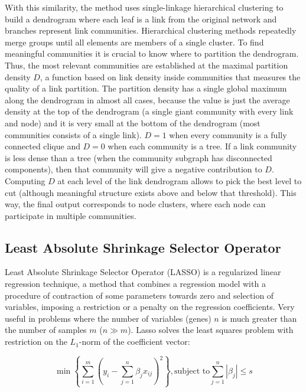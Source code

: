 \documentclass[12pt,journal, onecolumn]{IEEEtran}
\newcommand{\abs}[1]{\left\vert#1\right\vert}
\begin{document}
With this similarity, the method uses single-linkage hierarchical clustering to build a dendrogram where each leaf is a link from the original network and branches represent link communities. Hierarchical clustering methods repeatedly merge groups until all elements are members of a single cluster. To find meaningful communities it is crucial to know where to partition the dendrogram. Thus, the most relevant communities are established at the maximal partition density $D$, a function  based on link density inside communities that measures the quality of a link partition. The partition density has a single global maximum along the dendrogram in almost all cases, because the value is just the average density at the top of the dendrogram (a single giant community with every link and node) and it is very small at the bottom of the dendrogram (most communities consists of a single link). $D = 1$ when every community is a fully connected clique and $D = 0$ when each community is a tree. If a link community is less dense than a tree (when the community subgraph has disconnected components), then that community will give a negative contribution to $D$. Computing $D$ at each level of the link dendrogram allows to pick the best level to cut (although meaningful structure exists above and below that threshold). This way, the final output corresponds to node clusters, where each node can participate in multiple communities.\\

\subsection{Least Absolute Shrinkage Selector Operator}
Least Absolute Shrinkage Selector Operator (LASSO) is a regularized linear regression technique, a method that combines a regression model with a procedure of contraction of some parameters towards zero and selection of variables, imposing a restriction or a penalty on the regression coefficients. Very useful in problems where the number of variables (genes) $ n $ is much greater than the number of samples $ m $ ($ n \gg m $). Lasso solves the least squares problem with restriction on the $ L_1$-norm of the coefficient vector:

\begin{equation}
\min \left\lbrace\sum_{i=1}^{m}{\left( y_i-\sum_{j=1}^n{\beta_j x_{ij}}\right)^2} \right\rbrace , \textrm{subject to} \sum_{j=1}^n\abs{\beta_j}\leq s
\end{equation}
\end{document}
